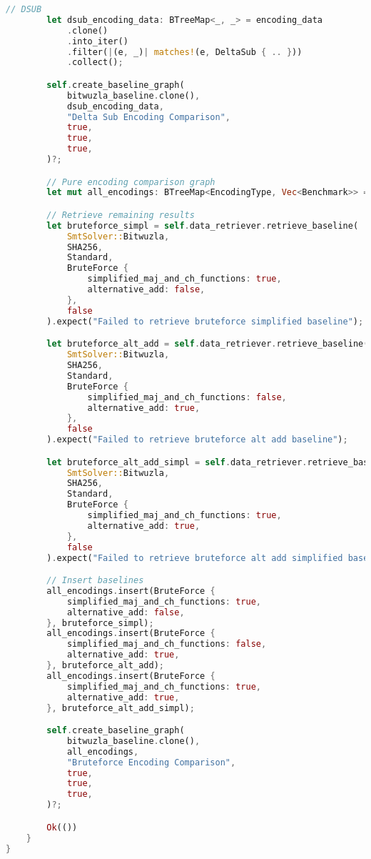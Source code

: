 \begin{lstlisting}[language=rust, caption={graphing/graphs.rs}]
		// DSUB
		let dsub_encoding_data: BTreeMap<_, _> = encoding_data
			.clone()
			.into_iter()
			.filter(|(e, _)| matches!(e, DeltaSub { .. }))
			.collect();

		self.create_baseline_graph(
			bitwuzla_baseline.clone(),
			dsub_encoding_data,
			"Delta Sub Encoding Comparison",
			true,
			true,
			true,
		)?;

		// Pure encoding comparison graph
		let mut all_encodings: BTreeMap<EncodingType, Vec<Benchmark>> = BTreeMap::new();

		// Retrieve remaining results
		let bruteforce_simpl = self.data_retriever.retrieve_baseline(
			SmtSolver::Bitwuzla,
			SHA256,
			Standard,
			BruteForce {
				simplified_maj_and_ch_functions: true,
				alternative_add: false,
			},
			false
		).expect("Failed to retrieve bruteforce simplified baseline");

		let bruteforce_alt_add = self.data_retriever.retrieve_baseline(
			SmtSolver::Bitwuzla,
			SHA256,
			Standard,
			BruteForce {
				simplified_maj_and_ch_functions: false,
				alternative_add: true,
			},
			false
		).expect("Failed to retrieve bruteforce alt add baseline");

		let bruteforce_alt_add_simpl = self.data_retriever.retrieve_baseline(
			SmtSolver::Bitwuzla,
			SHA256,
			Standard,
			BruteForce {
				simplified_maj_and_ch_functions: true,
				alternative_add: true,
			},
			false
		).expect("Failed to retrieve bruteforce alt add simplified baseline");

		// Insert baselines
		all_encodings.insert(BruteForce {
			simplified_maj_and_ch_functions: true,
			alternative_add: false,
		}, bruteforce_simpl);
		all_encodings.insert(BruteForce {
			simplified_maj_and_ch_functions: false,
			alternative_add: true,
		}, bruteforce_alt_add);
		all_encodings.insert(BruteForce {
			simplified_maj_and_ch_functions: true,
			alternative_add: true,
		}, bruteforce_alt_add_simpl);

		self.create_baseline_graph(
			bitwuzla_baseline.clone(),
			all_encodings,
			"Bruteforce Encoding Comparison",
			true,
			true,
			true,
		)?;

		Ok(())
	}
}
\end{lstlisting}

